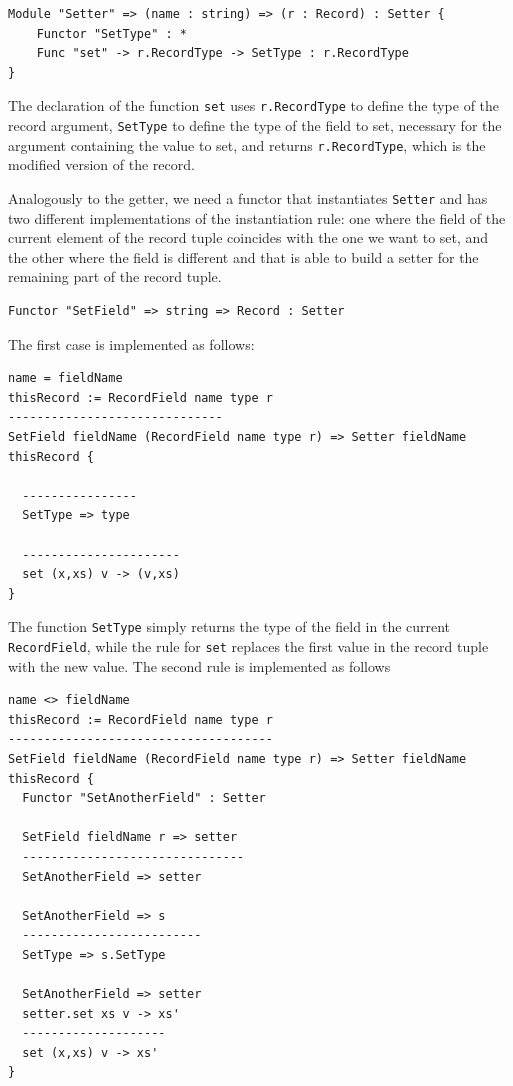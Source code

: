 \begin{lstlisting}
Module "Setter" => (name : string) => (r : Record) : Setter {
	Functor "SetType" : *
	Func "set" -> r.RecordType -> SetType : r.RecordType
}
\end{lstlisting}

\noindent
The declaration of the function \texttt{set} uses \texttt{r.RecordType} to define the type of the record argument, \texttt{SetType} to define the type of the field to set, necessary for the argument containing the value to set, and returns \texttt{r.RecordType}, which is the modified version of the record.

Analogously to the getter, we need a functor that instantiates \texttt{Setter} and has two different implementations of the instantiation rule: one where the field of the current element of the record tuple coincides with the one we want to set, and the other where the field is different and that is able to build a setter for the remaining part of the record tuple.

\begin{lstlisting}
Functor "SetField" => string => Record : Setter
\end{lstlisting}

The first case is implemented as follows:

\begin{lstlisting}[caption = Setting a field (case 1), label = lst:ch_functors_setter1]
name = fieldName
thisRecord := RecordField name type r
------------------------------
SetField fieldName (RecordField name type r) => Setter fieldName thisRecord {

  ----------------
  SetType => type
  
  ----------------------
  set (x,xs) v -> (v,xs)
}
\end{lstlisting}

\noindent
The function \texttt{SetType} simply returns the type of the field in the current \texttt{RecordField}, while the rule for \texttt{set} replaces the first value in the record tuple with the new value. The second rule is implemented as follows

\begin{lstlisting}[caption = Setting a field (case 2), label = lst:ch_functors_setter2]
name <> fieldName
thisRecord := RecordField name type r
-------------------------------------
SetField fieldName (RecordField name type r) => Setter fieldName thisRecord {
  Functor "SetAnotherField" : Setter
  
  SetField fieldName r => setter
  -------------------------------
  SetAnotherField => setter
  
  SetAnotherField => s
  -------------------------
  SetType => s.SetType
  
  SetAnotherField => setter
  setter.set xs v -> xs'
  --------------------
  set (x,xs) v -> xs'
}
\end{lstlisting}

